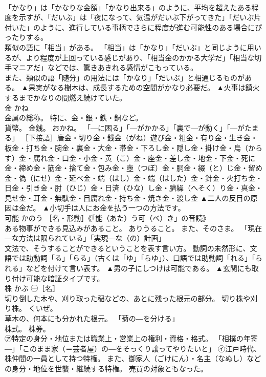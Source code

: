 \documentclass[8pt]{extreport}
\begin{document}
\begin{CJK}{UTF8}{min}
\\	「かなり」は「かなりな金額」「かなり出来る」のように、平均を超えたある程度を示すが、「だいぶ」は「夜になって、気温がだいぶ下がってきた」「だいぶ片付いた」のように、進行している事柄でさらに程度が進む可能性のある場合にぴったりする。 
\\	類似の語に「相当」がある。 「相当」は「かなり」「だいぶ」と同じように用いるが、より程度が上回っている感じがあり、「相当金のかかる大学だ」「相当な切手マニアだ」などでは、驚きあきれる感情がこもっている。 
\\	また、類似の語「随分」の用法には「かなり」「だいぶ」と相通じるものがある。	▲果実がなる樹木は、成長するための空間がかなり必要だ。 ▲火事は鎮火するまでかなりの間燃え続けていた。
\\	金	かね	
\\	金属の総称。 特に、金・銀・鉄・銅など。 
\\	貨幣。 金銭。 おかね。 「―に困る」「―がかかる」「裏で―が動く」「―がたまる」 ［下接語］唐金・切り金・銭金（がね）遊び金・粗金・有り金・生き金・板金・打ち金・腕金・裏金・大金・帯金・下ろし金・隠し金・掛け金・烏（からす）金・腐れ金・口金・小金・黄（こ）金・座金・差し金・地金・下金・死に金・締め金・筋金・捨て金・包み金・壺（つぼ）金・胴金・綴（と）じ金・留め金・偽（にせ）金・延べ金・端（はし）金・端（はした）金・針金・火打ち金・日金・引き金・肘（ひじ）金・日済（ひな）し金・臍繰（へそく）り金・真金・見せ金・耳金・無駄金・目腐れ金・持ち金・焼き金・渡し金	▲二人の反目の原因は金だ。 ▲小切手は人にお金を払う一つの方法です。
\\	可能	かのう	［名・形動］《「能（あた）う可（べ）き」の音読》 
\\	ある物事ができる見込みがあること。 ありうること。 また、そのさま。 「現在―な方法は限られている」「実現―な（の）計画」 
\\	文法で、そうすることができるということを表す言い方。 動詞の未然形に、文語では助動詞「る」「らる」（古くは「ゆ」「らゆ」）、口語では助動詞「れる」「られる」などを付けて言い表す。	▲男の子にしつけは可能である。 ▲玄関にも取り付け可能な暗証タイプです。
\\	株	かぶ	㊀［名］ 
\\	切り倒した木や、刈り取った稲などの、あとに残った根元の部分。 切り株や刈り株。 くいぜ。 
\\	草木の、何本にも分かれた根元。 「菊の―を分ける」 
\\	株式。 株券。 
\\	㋐特定の身分・地位または職業上・営業上の権利・資格・格式。 「相撲の年寄―」「このまま家（＝芸者屋）の―をそっくり譲ってやりたいと」 ㋑江戸時代、株仲間の一員として持つ特権。 また、御家人（ごけにん）・名主（なぬし）などの身分・地位を世襲・継続する特権。 売買の対象ともなった。 

\end{CJK}
\end{document}
